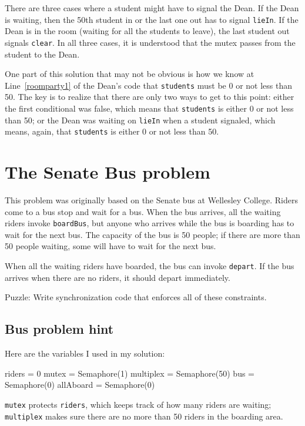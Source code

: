 \documentclass{book}
\begin{document}
There are three cases where a student might have to signal the Dean.
If the Dean is waiting, then the 50th student in or the last one out
has to signal {\tt lieIn}.  If the Dean is in the room (waiting for
all the students to leave), the last student out signals {\tt clear}.
In all three cases, it is understood that the mutex passes from the
student to the Dean.

One part of this solution that may not be obvious is how we know at
Line~\ref{roomparty1} of the Dean's code that {\tt students} must be 0
or not less than 50.  The key is to realize that there are only two
ways to get to this point: either the first conditional was false,
which means that {\tt students} is either 0 or not less than 50; or
the Dean was waiting on {\tt lieIn} when a student signaled, which
means, again, that {\tt students} is either 0 or not less than 50.



\section{The Senate Bus problem}

This problem was originally based on the Senate bus at Wellesley
College.  Riders come to a bus stop and wait for a bus.  When the bus
arrives, all the waiting riders invoke {\tt boardBus}, but anyone who
arrives while the bus is boarding has to wait for the next bus.  The
capacity of the bus is 50 people; if there are more than 50 people
waiting, some will have to wait for the next bus.

When all the waiting riders have boarded,
the bus can invoke {\tt depart}.  If the bus arrives when there
are no riders, it should depart immediately.

Puzzle: Write synchronization code that enforces all of these
constraints.



\subsection {Bus problem hint}

Here are the variables I used in my solution:

\begin{unbreakable}[title={Bus problem hint}]{}
riders = 0
mutex = Semaphore(1)
multiplex = Semaphore(50)
bus = Semaphore(0)
allAboard = Semaphore(0)
\end{unbreakable}

{\tt mutex} protects {\tt riders}, which keeps track of
how many riders are waiting;
{\tt multiplex} makes sure there are no more than 50 riders
in the boarding area.
\end{document}
